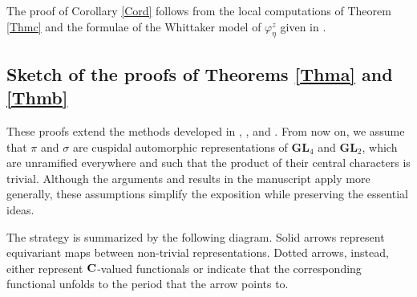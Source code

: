 \documentclass[11pt, reqno]{amsart}
\theoremstyle{plain}
\theoremstyle{definition}
\theoremstyle{remark}
\theoremstyle{plain}
\def\C{{\bf C}}
\def\GL{\mathbf{GL}}
\begin{document}
The proof of Corollary \ref{Cord} follows from the local computations of Theorem \ref{Thmc} and the formulae of the Whittaker model of $\varphi^z_\eta$ given in \cite{Watanabe:Global:Theta}. 

\subsection{Sketch of the proofs of Theorems \ref{Thma} and \ref{Thmb}}\label{subsec_sketch_proofs}
These proofs extend the methods developed in \cite{WaldsToricPeriods}, \cite{KudlaHarrisJacquet}, and \cite{GinzburgRallis}. From now on, we assume that $\pi$ and $\sigma$ are cuspidal automorphic representations of $\GL_4$ and $\GL_2$, which are unramified everywhere and such that the product of their central characters is trivial. Although the arguments and results in the manuscript apply more generally, these assumptions simplify the exposition while preserving the essential ideas. 

The strategy is summarized by the following diagram. Solid arrows represent equivariant maps between non-trivial representations. Dotted arrows, instead, either represent $\C$-valued functionals or indicate that the corresponding functional unfolds to the period that the arrow points to.
\end{document}
